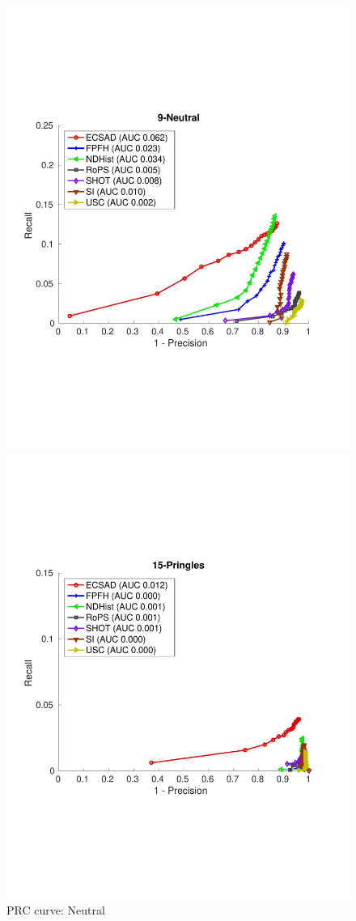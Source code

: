 \documentclass[10pt,twocolumn,letterpaper]{article}
\begin{document}
\begin{figure}[h]
\begin{minipage}[b]{.3\textwidth}
\includegraphics[clip, trim=0.7cm 6cm 0.7cm 6cm,width=1.0\linewidth, height= 1.0\linewidth, keepaspectratio]{img/9-Neutral_L2_RATIO_zoom.pdf} 
\caption{PRC curve: Neutral }\label{fig:neutral}
\end{minipage}\qquad
\begin{minipage}[b]{.3\textwidth}
\includegraphics[clip, trim=0.7cm 6cm 0.7cm 6cm,width=1.0\linewidth, height= 1.0\linewidth, keepaspectratio]{img/15-Pringles_L2_RATIO_zoom.pdf}

\end{minipage}
\end{figure}
\end{document}
